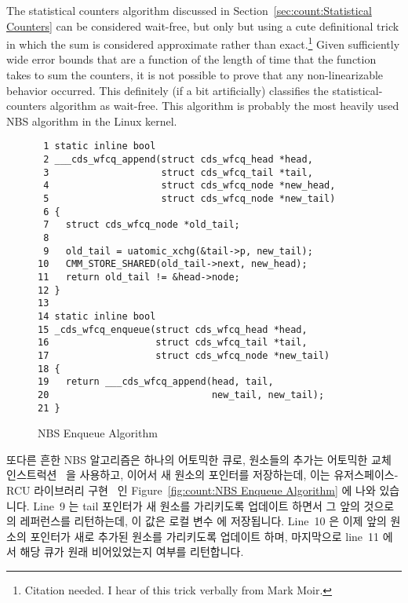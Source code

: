 The statistical counters algorithm discussed in
Section~\ref{sec:count:Statistical Counters}
can be considered wait-free, but only but using a cute definitional trick
in which the sum is considered approximate rather than exact.\footnote{
	Citation needed.
	I hear of this trick verbally from Mark Moir.}
Given sufficiently wide error bounds that are a function of the length
of time that the  function takes to sum the counters,
it is not possible to prove that any non-linearizable behavior occurred.
This definitely (if a bit artificially) classifies the statistical-counters
algorithm as wait-free.
This algorithm is probably the most heavily used NBS algorithm in
the Linux kernel.
\fi

\begin{figure}[tbp]
{ \scriptsize
\begin{verbatim}
 1 static inline bool
 2 ___cds_wfcq_append(struct cds_wfcq_head *head,
 3                    struct cds_wfcq_tail *tail,
 4                    struct cds_wfcq_node *new_head,
 5                    struct cds_wfcq_node *new_tail)
 6 {
 7   struct cds_wfcq_node *old_tail;
 8 
 9   old_tail = uatomic_xchg(&tail->p, new_tail);
10   CMM_STORE_SHARED(old_tail->next, new_head);
11   return old_tail != &head->node;
12 }
13 
14 static inline bool
15 _cds_wfcq_enqueue(struct cds_wfcq_head *head,
16                   struct cds_wfcq_tail *tail,
17                   struct cds_wfcq_node *new_tail)
18 {
19   return ___cds_wfcq_append(head, tail,
20                             new_tail, new_tail);
21 }
\end{verbatim}
}
\caption{NBS Enqueue Algorithm}
\label{fig:count:NBS Enqueue Algorithm}
\end{figure}

또다른 흔한 NBS 알고리즘은 하나의 어토믹한 큐로, 원소들의 추가는 어토믹한 교체
인스트럭션~\cite{MagedMichael1993JPDC} 을 사용하고, 이어서 새 원소의
 포인터를 저장하는데, 이는 유저스페이스-RCU 라이브러리
구현~\cite{MathieuDesnoyers2009URCU} 인 Figure~\ref{fig:count:NBS Enqueue
Algorithm} 에 나와 있습니다.
Line~9 는 tail 포인터가 새 원소를 가리키도록 업데이트 하면서 그 앞의 것으로의
레퍼런스를 리턴하는데, 이 값은 로컬 변수  에 저장됩니다.
Line~10 은 이제 앞의 원소의  포인터가 새로 추가된 원소를 가리키도록
업데이트 하며, 마지막으로 line~11 에서 해당 큐가 원래 비어있었는지 여부를
리턴합니다.
\iffalse

Another common NBS algorithm is the atomic queue where elements are
enqueued using an atomic exchange instruction~\cite{MagedMichael1993JPDC},
followed by a store into the \co{->next} pointer of the new element's
predecessor, as shown in
Figure~\ref{fig:count:NBS Enqueue Algorithm},
which shows the userspace-RCU library
implementation~\cite{MathieuDesnoyers2009URCU}.
Line~9 updates the tail pointer to reference the new element while
returning a reference to its predecessor, which is stored in
local variable \co{old_tail}.
Line~10 then updates the predecessor's \co{->next} pointer to
reference the newly added element, and finally line~11
returns an indication as to whether or not the queue was initially
empty.
\fi

